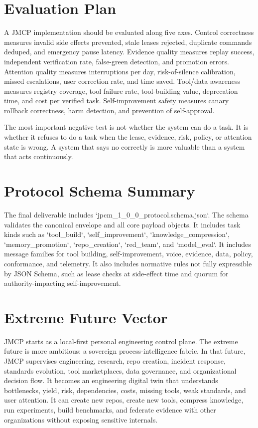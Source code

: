 \documentclass[journal,onecolumn]{IEEEtran}
\begin{document}
\section{Evaluation Plan}
A JMCP implementation should be evaluated along five axes. Control correctness measures invalid side effects prevented, stale leases rejected, duplicate commands deduped, and emergency pause latency. Evidence quality measures replay success, independent verification rate, false-green detection, and promotion errors. Attention quality measures interruptions per day, risk-of-silence calibration, missed escalations, user correction rate, and time saved. Tool/data awareness measures registry coverage, tool failure rate, tool-building value, deprecation time, and cost per verified task. Self-improvement safety measures canary rollback correctness, harm detection, and prevention of self-approval.

The most important negative test is not whether the system can do a task. It is whether it refuses to do a task when the lease, evidence, risk, policy, or attention state is wrong. A system that says no correctly is more valuable than a system that acts continuously.

\section{Protocol Schema Summary}
The final deliverable includes `jpcm\_1\_0\_0\_protocol.schema.json`. The schema validates the canonical envelope and all core payload objects. It includes task kinds such as `tool\_build`, `self\_improvement`, `knowledge\_compression`, `memory\_promotion`, `repo\_creation`, `red\_team`, and `model\_eval`. It includes message families for tool building, self-improvement, voice, evidence, data, policy, conformance, and telemetry. It also includes normative rules not fully expressible by JSON Schema, such as lease checks at side-effect time and quorum for authority-impacting self-improvement.

\section{Extreme Future Vector}
JMCP starts as a local-first personal engineering control plane. The extreme future is more ambitious: a sovereign process-intelligence fabric. In that future, JMCP supervises engineering, research, repo creation, incident response, standards evolution, tool marketplaces, data governance, and organizational decision flow. It becomes an engineering digital twin that understands bottlenecks, yield, risk, dependencies, costs, missing tools, weak standards, and user attention. It can create new repos, create new tools, compress knowledge, run experiments, build benchmarks, and federate evidence with other organizations without exposing sensitive internals.
\end{document}
